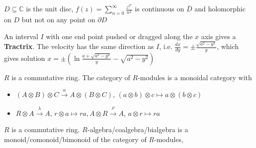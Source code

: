 \documentclass[main]{subfiles}
\begin{document}
\begin{example}
$D\subseteq\mathbb C$ is the unit disc, $\displaystyle f(z)=\sum_{n=0}^\infty \frac{z^{2^n}}{n^2}$ is continuous on $\overline D$ and holomorphic on $D$ but not on any point on $\partial D$
\end{example}

\begin{example}[Tractrix]
An interval $I$ with one end point pushed or dragged along the $x$ axis gives a \textbf{Tractrix}. The velocity has the same direction as $I$, i.e. $\displaystyle\frac{dx}{dy}=\pm\frac{\sqrt{a^2-y^2}}{y}$, which gives solution $\displaystyle x=\pm\left(\ln\frac{a+\sqrt{a^2-y^2}}{y}-\sqrt{a^2-y^2}\right)$
\begin{center}
\end{center}
\end{example}

\begin{example}
$R$ is a commutative ring. The category of $R$-modules is a monoidal category with
\begin{itemize}
\item $(A\otimes B)\otimes C\xrightarrow{\alpha} A\otimes (B\otimes C)$, $(a\otimes b)\otimes c\mapsto a\otimes (b\otimes c)$
\item $R\otimes A\xrightarrow{\lambda}A$, $r\otimes a\mapsto ra, A\otimes R\xrightarrow{\rho}A$, $a\otimes r\mapsto ra$
\end{itemize}
\end{example}

\begin{example}
$R$ is a commutative ring. $R$-algebra/coalgebra/bialgebra is a monoid/comonoid/bimonoid of the category of $R$-modules, 
\end{example}
\end{document}
